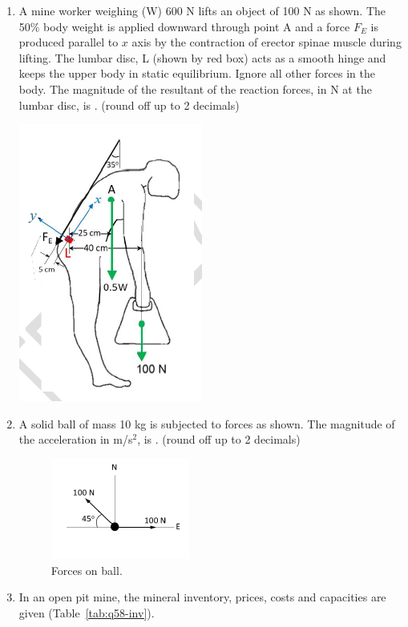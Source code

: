 \documentclass[journal]{IEEEtran}
\begin{document}
\begin{enumerate}[leftmargin=0pt]
\hfill{}
\item A mine worker weighing (W) 600 N lifts an object of 100 N as shown. 
The 50\% body weight is applied downward through point A and a force $F_E$ is produced parallel to $x$ axis by the contraction of erector spinae muscle during lifting. 
The lumbar disc, L (shown by red box) acts as a smooth hinge and keeps the upper body in static equilibrium. 
Ignore all other forces in the body. 
The magnitude of the resultant of the reaction forces, in N at the lumbar disc, is \underline{\hspace{1.5cm}}. (round off up to 2 decimals)

\par\noindent
\begin{minipage}{\linewidth}
  \centering
  \includegraphics[width=0.5\linewidth]{figs/worker.png}%
  \label{fig:lift}
\end{minipage}

\hfill{}

\hfill{}
\item A solid ball of mass 10 kg is subjected to forces as shown. The magnitude of the acceleration in m/s$^2$, is \underline{\hspace{1.5cm}}. (round off up to 2 decimals)
\begin{figure}[h!]
\centering
\includegraphics[width=0.5\linewidth]{figs/forces.png}
\caption{Forces on ball.}
\label{fig:ball}
\end{figure}
\hfill{}
\newpage
\item In an open pit mine, the mineral inventory, prices, costs and capacities are given
(Table~\ref{tab:q58-inv}).


\end{enumerate}
\end{document}
